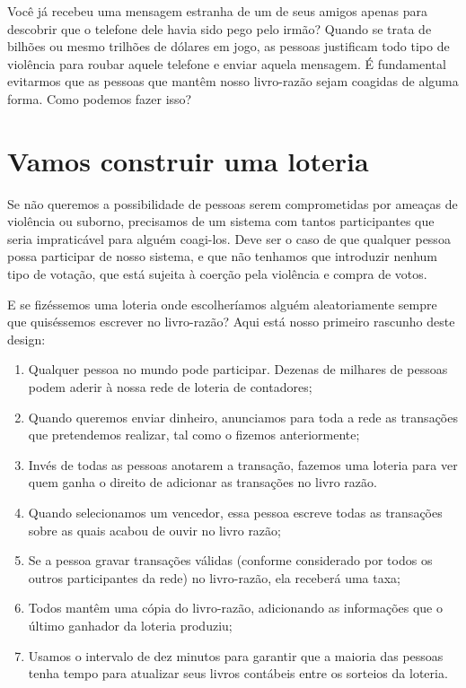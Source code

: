 Você já recebeu uma mensagem estranha de um de seus amigos apenas para descobrir que o telefone dele havia sido pego pelo irmão? Quando se trata de bilhões ou mesmo trilhões de dólares em jogo, as pessoas justificam todo tipo de violência para roubar aquele telefone e enviar aquela mensagem. É fundamental evitarmos que as pessoas que mantêm nosso livro-razão sejam coagidas de alguma forma. Como podemos fazer isso?

\section*{Vamos construir uma loteria}
Se não queremos a possibilidade de pessoas serem comprometidas por ameaças de violência ou suborno, precisamos de um sistema com tantos participantes que seria impraticável para alguém coagi-los. Deve ser o caso de que qualquer pessoa possa participar de nosso sistema, e que não tenhamos que introduzir nenhum tipo de votação, que está sujeita à coerção pela violência e compra de votos.

E se fizéssemos uma loteria onde escolheríamos alguém aleatoriamente sempre que quiséssemos escrever no livro-razão? Aqui está nosso primeiro rascunho deste design:

\begin{samepage}
\begin{enumerate}
\item Qualquer pessoa no mundo pode participar. Dezenas de milhares de pessoas podem aderir à nossa rede de loteria de contadores;
\item Quando queremos enviar dinheiro, anunciamos para toda a rede as transações que pretendemos realizar, tal como o fizemos anteriormente;
\item Invés de todas as pessoas anotarem a transação, fazemos uma loteria para ver quem ganha o direito de adicionar as transações no livro razão.
\item Quando selecionamos um vencedor, essa pessoa escreve todas as transações sobre as quais acabou de ouvir no livro razão;
\item Se a pessoa gravar transações válidas (conforme considerado por todos os outros participantes da rede) no livro-razão, ela receberá uma taxa;
\item Todos mantêm uma cópia do livro-razão, adicionando as informações que o último ganhador da loteria produziu;
\item Usamos o intervalo de dez minutos para garantir que a maioria das pessoas tenha tempo para atualizar seus livros contábeis entre os sorteios da loteria.
\end{enumerate}
\end{samepage}

